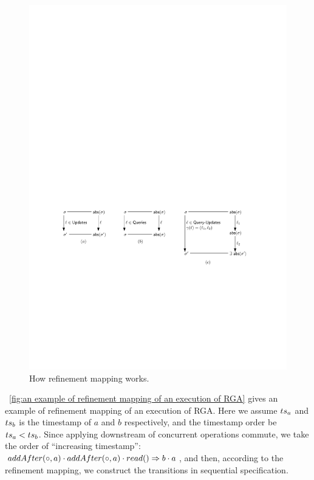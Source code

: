 \begin{figure}[t]
  \centering
  \includegraphics[width=0.8 \textwidth]{figures/RefinementMapping.pdf}
\vspace{-10pt}
  \caption{How refinement mapping works.}
  \label{fig:how refinement mapping works}
\end{figure}



\figurename~\ref{fig:an example of refinement mapping of an execution of RGA} gives an example of refinement mapping of an execution of RGA. Here we assume $\ats_a$ and $\ats_b$ is the timestamp of $a$ and $b$ respectively, and the timestamp order be $\ats_a < \ats_b$. Since applying downstream of concurrent operations commute, we take the order of ``increasing timestamp'': $\alabelshort[addAfter]{\circ,a} \cdot \alabelshort[addAfter]{\circ,a} \cdot \alabellong[read]{}{b \cdot a}{}$, and then, according to the refinement mapping, we construct the transitions in sequential specification.

